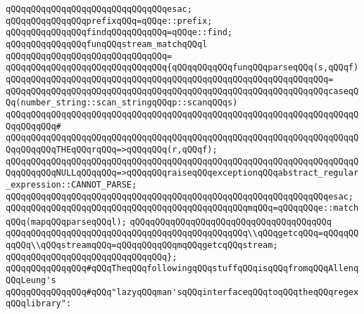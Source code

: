 \verb|qQQqqQQqqQQqqQQqqQQqqQQqqQQqqQQqesac;|\newline
\newline
\verb|qQQqqQQqqQQqqQQqprefixqQQq=qQQqe::prefix;|\newline
\verb|qQQqqQQqqQQqqQQqfindqQQqqQQqqQQq=qQQqe::find;|\newline
\newline
\verb|qQQqqQQqqQQqqQQqfunqQQqstream_matchqQQql|\newline
\verb|qQQqqQQqqQQqqQQqqQQqqQQqqQQqqQQq=|\newline
\verb|qQQqqQQqqQQqqQQqqQQqqQQqqQQqqQQq{qQQqqQQqqQQqfunqQQqparseqQQq(s,qQQqf)|\newline
\verb|qQQqqQQqqQQqqQQqqQQqqQQqqQQqqQQqqQQqqQQqqQQqqQQqqQQqqQQqqQQqqQQq=|\newline
\verb|qQQqqQQqqQQqqQQqqQQqqQQqqQQqqQQqqQQqqQQqqQQqqQQqqQQqqQQqqQQqqQQqcaseqQQq(number_string::scan_stringqQQqp::scanqQQqs)|\newline
\verb|qQQqqQQqqQQqqQQqqQQqqQQqqQQqqQQqqQQqqQQqqQQqqQQqqQQqqQQqqQQqqQQqqQQqqQQqqQQqqQQq#|\newline
\verb|qQQqqQQqqQQqqQQqqQQqqQQqqQQqqQQqqQQqqQQqqQQqqQQqqQQqqQQqqQQqqQQqqQQqqQQqqQQqqQQqTHEqQQqrqQQq=>qQQqqQQq(r,qQQqf);|\newline
\verb|qQQqqQQqqQQqqQQqqQQqqQQqqQQqqQQqqQQqqQQqqQQqqQQqqQQqqQQqqQQqqQQqqQQqqQQqqQQqqQQqNULLqQQqqQQq=>qQQqqQQqraiseqQQqexceptionqQQqabstract_regular_expression::CANNOT_PARSE;|\newline
\verb|qQQqqQQqqQQqqQQqqQQqqQQqqQQqqQQqqQQqqQQqqQQqqQQqqQQqqQQqqQQqqQQqesac;|\newline
\newline
\verb|qQQqqQQqqQQqqQQqqQQqqQQqqQQqqQQqqQQqqQQqqQQqqQQqmqQQq=qQQqqQQqe::matchqQQq(mapqQQqparseqQQql);|\newline
\verb|qQQqqQQqqQQqqQQqqQQqqQQqqQQqqQQqqQQqqQQq|\newline
\verb|qQQqqQQqqQQqqQQqqQQqqQQqqQQqqQQqqQQqqQQqqQQqqQQq\\qQQqgetcqQQq=qQQqqQQqqQQq\\qQQqstreamqQQq=qQQqqQQqqQQqmqQQqgetcqQQqstream;|\newline
\verb|qQQqqQQqqQQqqQQqqQQqqQQqqQQqqQQq};|\newline
\newline
\newline
\newline
\verb|qQQqqQQqqQQqqQQq#qQQqTheqQQqfollowingqQQqstuffqQQqisqQQqfromqQQqAllenqQQqLeung's|\newline
\verb|qQQqqQQqqQQqqQQq#qQQq"lazyqQQqman'sqQQqinterfaceqQQqtoqQQqtheqQQqregexqQQqlibrary":|\newline
